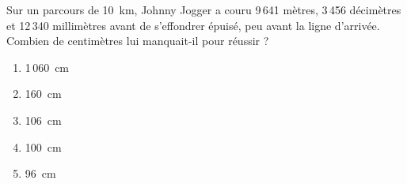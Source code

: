 Sur un parcours de 10~km, Johnny Jogger a couru 9\,641 mètres, 3\,456 décimètres et 12\,340 millimètres avant de s'effondrer épuisé, peu avant la ligne d'arrivée. Combien de centimètres lui manquait-il pour réussir ?
\begin{multicols}{5}
  \begin{enumerate}[A/]
  \item 1\,060~cm
  \item 160~cm
  \item 106~cm
  \item 100~cm
  \item 96~cm
  \end{enumerate}
  \end{multicols}
